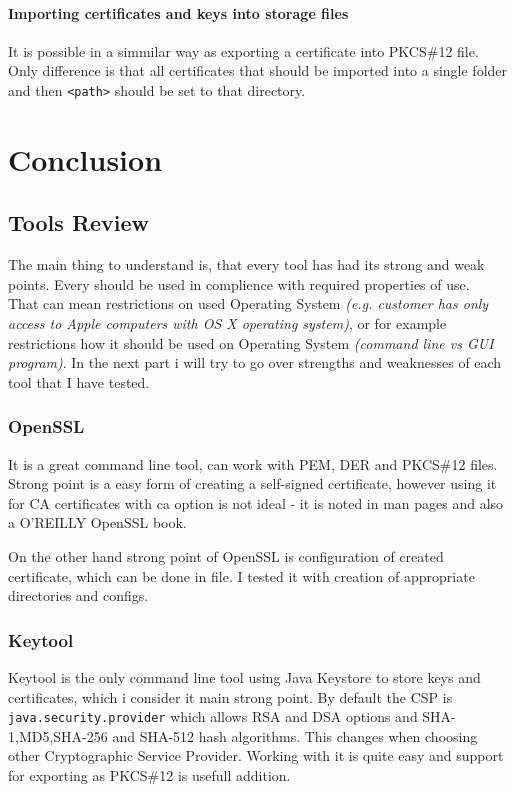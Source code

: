 \documentclass[10pt, a4paper]{report}
\begin{document}
  \subsection{Importing certificates and keys into storage files}
It is possible in a simmilar way as exporting a certificate into PKCS\#12 file. Only difference is that all certificates that should be imported into a single folder and then \verb+<path>+ should be set to that directory. 
  
\part{Conclusion}

\chapter{Tools Review}

The main thing to understand is, that every tool has had its strong and weak points. Every should be used in complience with required properties of use.\\ 

That can mean restrictions on used Operating System \textit{(e.g. customer has only access to Apple computers with OS X operating system)}, or for example restrictions how it should be used on Operating System \textit{(command line vs GUI program)}. In the next part i will try to go over strengths and weaknesses of each tool that I have tested.

\section{OpenSSL}
It is a great command line tool, can work with PEM, DER and PKCS\#12 files. Strong point is a easy form of
creating a self-signed certificate, however using it for CA certificates with ca option is not ideal - it is noted in man
pages and also a O’REILLY OpenSSL book. 


On the other hand strong point of OpenSSL is configuration of created certificate, which can be done in file. I tested it with creation of appropriate directories and configs.

\section{Keytool}
Keytool is the only command line tool using Java Keystore to store keys and certificates, which i consider it main strong point. By default the CSP is \verb+java.security.provider+ which allows RSA and DSA options and SHA-1,MD5,SHA-256 and SHA-512 hash algorithms. This changes when choosing other Cryptographic Service Provider. Working with it is quite easy and support for exporting as PKCS\#12 is usefull addition.
\end{document}
